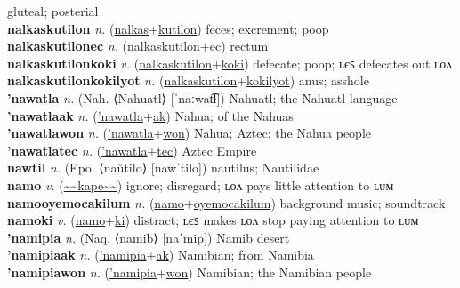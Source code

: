 gluteal; posterial \label{nalkasak} \\
\textbf{nalkaskutilon} \textit{n.} (\hyperref[nalkas]{nalkas}+\hyperref[kutilon]{kutilon})
feces; excrement; poop \label{nalkaskutilon} \\
\textbf{nalkaskutilonec} \textit{n.} (\hyperref[nalkaskutilon]{nalkaskutilon}+\hyperref[ec]{ec})
rectum \label{nalkaskutilonec} \\
\textbf{nalkaskutilonkoki} \textit{v.} (\hyperref[nalkaskutilon]{nalkaskutilon}+\hyperref[koki]{koki})
defecate; poop; ʟєꜱ defecates out ʟᴏᴧ \label{nalkaskutilonkoki} \\
\textbf{nalkaskutilonkokilyot} \textit{n.} (\hyperref[nalkaskutilon]{nalkaskutilon}+\hyperref[kokilyot]{kokilyot})
anus; asshole \label{nalkaskutilonkokilyot} \\
\textbf{'nawatla} \textit{n.} (Nah. ⟨Nahuatl⟩ [ˈnaːwat͡ɬ])
Nahuatl; the Nahuatl language \label{'nawatla} \\
\textbf{'nawatlaak} \textit{n.} (\hyperref['nawatla]{'nawatla}+\hyperref[ak]{ak})
Nahua; of the Nahuas \label{'nawatlaak} \\
\textbf{'nawatlawon} \textit{n.} (\hyperref['nawatla]{'nawatla}+\hyperref[won]{won})
Nahua; Aztec; the Nahua people \label{'nawatlawon} \\
\textbf{'nawatlatec} \textit{n.} (\hyperref['nawatla]{'nawatla}+\hyperref[tec]{tec})
Aztec Empire \label{'nawatlatec} \\
\textbf{nawtil} \textit{n.} (Epo. ⟨naŭtilo⟩ [nawˈtilo])
nautilus; Nautilidae \label{nawtil} \\
\textbf{namo} \textit{v.} (\hyperref[kape]{\~{}\~{}kape\~{}\~{}})
ignore; disregard; ʟᴏᴧ pays little attention to ʟᴜᴍ \label{namo} \\
\textbf{namooyemocakilum} \textit{n.} (\hyperref[namo]{namo}+\hyperref[oyemocakilum]{oyemocakilum})
background music; soundtrack \label{namooyemocakilum} \\
\textbf{namoki} \textit{v.} (\hyperref[namo]{namo}+\hyperref[ki]{ki})
distract; ʟєꜱ makes ʟᴏᴧ stop paying attention to ʟᴜᴍ \label{namoki} \\
\textbf{'namipia} \textit{n.} (Naq. ⟨namib⟩ [naˈmip])
Namib desert \label{'namipia} \\
\textbf{'namipiaak} \textit{n.} (\hyperref['namipia]{'namipia}+\hyperref[ak]{ak})
Namibian; from Namibia \label{'namipiaak} \\
\textbf{'namipiawon} \textit{n.} (\hyperref['namipia]{'namipia}+\hyperref[won]{won})
Namibian; the Namibian people \label{'namipiawon} \\
